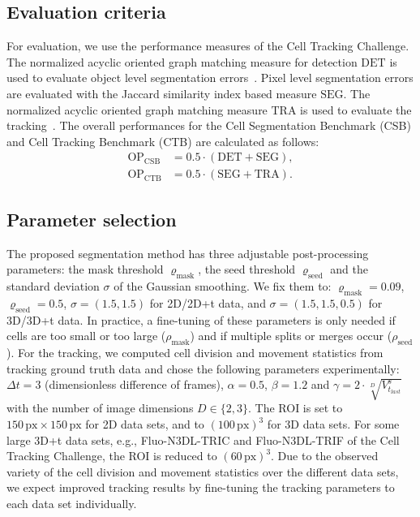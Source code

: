\documentclass[10pt,letterpaper]{article}
\begin{document}
\subsection*{Evaluation criteria}
For evaluation, we use the performance measures of the Cell Tracking Challenge. The normalized acyclic oriented graph matching measure for detection $\mathrm{DET}$ is used to evaluate object level segmentation errors~\cite{Matula2015}. Pixel level segmentation errors are evaluated with the Jaccard similarity index based measure $\mathrm{SEG}$. The normalized acyclic oriented graph matching measure $\mathrm{TRA}$ is used to evaluate the tracking~\cite{Matula2015}. The overall performances for the Cell Segmentation Benchmark (CSB) and Cell Tracking Benchmark (CTB) are calculated as follows:
\begin{align}
    \mathrm{OP}_{\text{CSB}} &= \num{0.5} \cdot (\mathrm{DET} + \mathrm{SEG}),\\
    \mathrm{OP}_{\text{CTB}} &= \num{0.5} \cdot (\mathrm{SEG} + \mathrm{TRA}).
\end{align}

\subsection*{Parameter selection}
The proposed segmentation method has three adjustable post-processing parameters: the mask threshold $\varrho_{\text{mask}}$, the seed threshold $\varrho_{\text{seed}}$ and the standard deviation $\sigma$ of the Gaussian smoothing. We fix them to: $\varrho_{\text{mask}}=\num{0.09}$, $\varrho_{\text{seed}} = \num{0.5}$, $\sigma = (1.5, 1.5)$ for 2D/2D+t data, and $\sigma = (1.5, 1.5, 0.5)$ for 3D/3D+t data. In practice, a fine-tuning of these parameters is only needed if cells are too small or too large ($\rho_{\text{mask}}$) and if multiple splits or merges occur ($\rho_{\text{seed}}$). For the tracking, we computed cell division and movement statistics from tracking ground truth data and chose the following parameters experimentally: $\Delta t=3$ (dimensionless difference of frames), $\alpha=0.5$, $\beta=1.2$ and $\gamma=2 \cdot\! \sqrt[D]{V^s_{t_{last}}}$ with the number of image dimensions $D \in \{2,3\}$. The ROI is set to $150\,\text{px}\!\times\!150\,\text{px}$ for 2D data sets, and to $(100\,\text{px})^3$ for 3D data sets. For some large 3D+t data sets, e.g., Fluo-N3DL-TRIC and Fluo-N3DL-TRIF of the Cell Tracking Challenge, the ROI is reduced to $(60\,\text{px})^3$. Due to the observed variety of the cell division and movement statistics over the different data sets, we expect improved tracking results by fine-tuning the tracking parameters to each data set individually.
\end{document}
